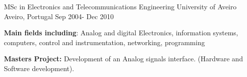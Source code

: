 

\begin{cventries}

  \cventry
    {MSc in Electronics and Telecommunications Engineering} %
    {University of Aveiro} %
    {Aveiro, Portugal} %
    {Sep 2004- Dec 2010} %
    {
      \begin{cvitems} %
       \item {\textbf{Main fields including}: Analog and digital Electronics, information systems, computers, control and instrumentation, networking, programming}
       \item{\textbf{Masters Project:} Development of an Analog signals interface. (Hardware and Software development).}
      \end{cvitems}
    }

\end{cventries}
